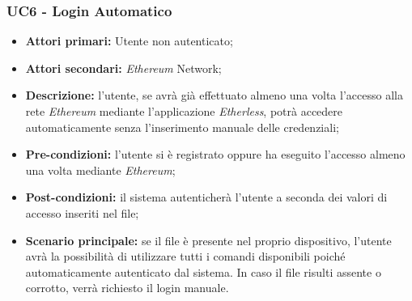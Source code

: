 \subsubsection{UC6 - Login Automatico}
\begin{itemize}
	\item \textbf{Attori primari:} Utente non autenticato;
	\item \textbf{Attori secondari:} \textit{Ethereum\glo} Network;
	\item \textbf{Descrizione:} l'utente, se avrà già effettuato almeno una volta l'accesso alla rete \textit{Ethereum\glo} mediante l'applicazione \textit{Etherless}, potrà accedere automaticamente senza l'inserimento manuale delle credenziali; 
	\item \textbf{Pre-condizioni:} l'utente si è registrato oppure ha eseguito l'accesso almeno una volta mediante \textit{Ethereum\glos};
	\item \textbf{Post-condizioni:} il sistema autenticherà l'utente a seconda dei valori di accesso inseriti nel file;
	\item \textbf{Scenario principale:} se il file è presente nel proprio dispositivo, l'utente avrà la possibilità di utilizzare tutti i comandi disponibili poiché automaticamente autenticato dal sistema. In caso il file risulti assente o corrotto, verrà richiesto il login manuale.
\end{itemize}